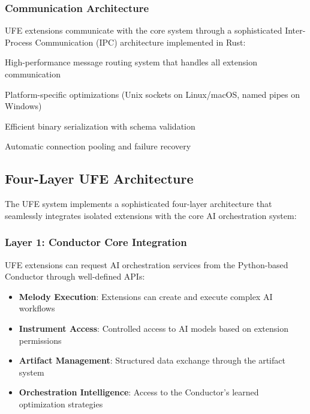 \subsubsection{Communication Architecture}

UFE extensions communicate with the core system through a sophisticated Inter-Process Communication (IPC) architecture implemented in Rust:

\begin{description}[leftmargin=4cm,labelwidth=3.5cm]
    \item[\textbf{IPC Bus}] High-performance message routing system that handles all extension communication
    \item[\textbf{Protocol Abstraction}] Platform-specific optimizations (Unix sockets on Linux/macOS, named pipes on Windows)
    \item[\textbf{Message Serialization}] Efficient binary serialization with schema validation
    \item[\textbf{Connection Management}] Automatic connection pooling and failure recovery
\end{description}

\subsection{Four-Layer UFE Architecture}

The UFE system implements a sophisticated four-layer architecture that seamlessly integrates isolated extensions with the core AI orchestration system:

\subsubsection{Layer 1: Conductor Core Integration}

UFE extensions can request AI orchestration services from the Python-based Conductor through well-defined APIs:

\begin{itemize}
    \item \textbf{Melody Execution}: Extensions can create and execute complex AI workflows
    \item \textbf{Instrument Access}: Controlled access to AI models based on extension permissions
    \item \textbf{Artifact Management}: Structured data exchange through the artifact system
    \item \textbf{Orchestration Intelligence}: Access to the Conductor's learned optimization strategies
\end{itemize}

